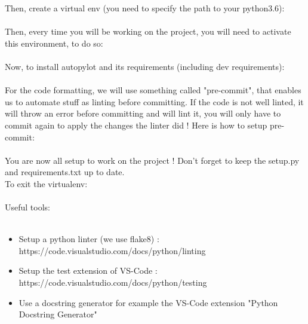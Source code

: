 \documentclass[12pt]{article}
\begin{document}
Then, create a virtual env (you need to specify the path to your python3.6):\\

\noindent{}\\

Then, every time you will be working on the project, you will need to activate this environment, to do so:\\

\noindent{}\\

Now, to install autopylot and its requirements (including dev requirements):\\

\noindent{}\\

For the code formatting, we will use something called "pre-commit", that enables us to automate stuff as linting before committing. If the code is not well linted, it will throw an error before committing and will lint it, you will only have to commit again to apply the changes the linter did ! Here is how to setup pre-commit:\\


\noindent{}\\

You are now all setup to work on the project ! Don't forget to keep the setup.py and requirements.txt up to date.\\

To exit the virtualenv:\\

\noindent{}\\

Useful tools:
\\\\
\begin{itemize}
    \item Setup a python linter (we use flake8) : https://code.visualstudio.com/docs/python/linting
    \item Setup the test extension of VS-Code : https://code.visualstudio.com/docs/python/testing
    \item Use a docstring generator for example the VS-Code extension "Python Docstring Generator"
\end{itemize}
\end{document}
